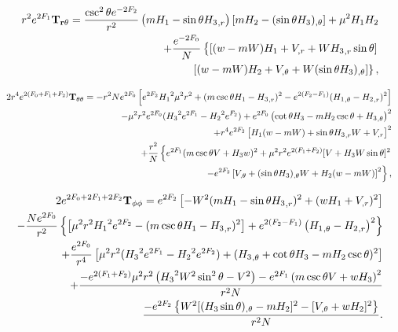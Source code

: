 \begin{eqnarray}
&&  r^2e^{2F_1}{\bf T_{r\theta}}= \frac{ \csc ^2\theta e^{-2 {F_2}}}{r^2} \left({m} {H_1}-\sin \theta {H_3}_{,r}\right) 
 \left[{m} {H_2}-(\sin\theta 
{H_3})_{,\theta}\right] +{\mu^2}  {H_1} 
{H_2}
 \nonumber \\
%
&&
+\frac{e^{-2 {F_0}}}{N} \left\{[ (w-{m}W) {H_1}+V_{,r}+ W{H_3}_{,r}\sin\theta ]\right. 
\nonumber \\
&&\left.\left[(w-{m}W) {H_2}+V_{,\theta}+W
(\sin\theta{H_3})_{,\theta}\right]
\right\},
\end{eqnarray}









\begin{eqnarray}
&& 2r^4e^{2(F_0+F_1+F_2)}{\bf T_{\theta\theta}}=-r^2 N e^{2 {F_0}} \left[e^{2 F_2} {H_1}^2 
{\mu^2} r^2 +( m\csc\theta H_1-{H_3}_{,r})^2  -e^{2( {F_2}-F_1)}( {H_1}_{,\theta}- 
{H_2}_{,r})^2\right] \nonumber \\
%
&&
-{\mu^2} r^2e^{2 {F_0}}({H_3}^2 e^{2 {F_1}}-{H_2}^2e^{F_2})
+e^{2 {F_0}} \left(\cot \theta {H_3}-m{H_2} \csc\theta+ {H_3}_{,\theta}\right)^2
 \nonumber \\
%
&&
+ r^4 e^{2 {F_2}} \left[
 {H_1} (w-{m} W)+ \sin\theta  {H_3}_{,r} W+
V_{,r} \right]^2 \nonumber \\
&&
%
+\frac{r^2}{N} \left\{e^{2 {F_1}}({m} \csc\theta 
 V+{H_3}w)^2 +{\mu^2} r^2e^{2 ({F_1}+F_2)}[V+ {H_3} W \sin\theta]^2 
 \right. \nonumber \\
%
&&
\left.
-e^{2 {F_2}}\left[
V_{,\theta}+ (\sin\theta  
{H_3})_{,\theta} W+ 
{H_2} (w-{m} W)\right]^2\right\},
\end{eqnarray}










 \begin{eqnarray}
&& 2e^{2F_0+2F_1+2F_2}{\bf T_{\phi\phi}}=e^{2F_2}\left[ -W^2(m{H_1}  
- \sin\theta  
{H_3}_{,r} )^2
+(wH_1+V_{,r})^2\right] \nonumber \\
% 
&&
-\frac{N e^{2 {F_0}}}{r^2} \left\{\left[ {\mu^2} r^2 {H_1}^2 e^{2 {F_2}}
-({m} \csc \theta  {H_1}
-{H_3}_{,r})^2\right] +e^{2(
{F_2}-F_1)}\left( {H_1}_{,\theta}- 
{H_2}_{,r}\right)^2\right\}
\nonumber \\
%
&&
+ \frac{e^{2 F_0}}{r^4} \left[{\mu^2} 
r^2( {H_3}^2 e^{2 {F_1}}- {H_2}^2 e^{2
{F_2}}) + ({H_3}_{,\theta}+ \cot
\theta  {H_3}-mH_2\csc\theta)^2\right]  \nonumber \\
%
%
&&
+\frac{- e^{2 (F_1+{F_2})} {\mu^2} r^2\left({H_3}^2  W^2 \sin ^2\theta  - V^2\right) -e^{2 {F_1}}\left(
{m} \csc\theta 
 V +w{H_3}  \right)^2}{r^2N} \nonumber \\
 && \frac{-e^{2 {F_2}}\left\{W^2[(H_3\sin\theta)_{,\theta}-mH_2]^2-[V_{,\theta}+wH_2]^2\right\}}{r^2N} .
\nonumber \\
 && 
\end{eqnarray}  



